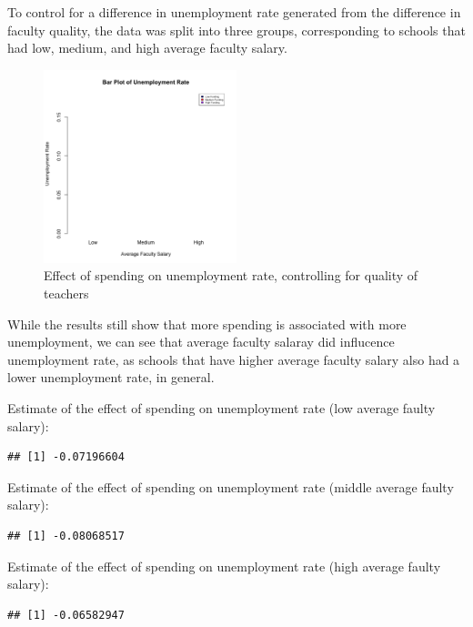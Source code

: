 \documentclass{article}\usepackage[]{graphicx}\usepackage[]{color}
\makeatletter
\newenvironment{kframe}{%
 \def\at@end@of@kframe{}%
 \ifinner\ifhmode%
  \def\at@end@of@kframe{\end{minipage}}%
  \begin{minipage}{\columnwidth}%
 \fi\fi%
 \def\FrameCommand##1{\hskip\@totalleftmargin \hskip-\fboxsep
 \colorbox{shadecolor}{##1}\hskip-\fboxsep
     \hskip-\linewidth \hskip-\@totalleftmargin \hskip\columnwidth}%
 \MakeFramed {\advance\hsize-\width
   \@totalleftmargin\z@ \linewidth\hsize
   \@setminipage}}%
 {\par\unskip\endMakeFramed%
 \at@end@of@kframe}
\newenvironment{knitrout}{}{} %
\makeatother
\begin{document}
To control for a difference in unemployment rate generated from the difference in faculty quality, the data was split into three groups, corresponding to schools that had low, medium, and high average faculty salary.  


\graphicspath{ {../images/} }
\begin{figure}
\centering
\includegraphics[width=0.5\textwidth]{funding}
\caption{Effect of spending on unemployment rate, controlling for quality of teachers}
\end{figure}


While the results still show that more spending is associated with more unemployment, we can see that average faculty salaray did influcence unemployment rate, as schools that have higher average faculty salary also had a lower unemployment rate, in general. 

Estimate of the effect of spending on unemployment rate (low average faulty salary):
\begin{knitrout}
\color{fgcolor}\begin{kframe}
\begin{verbatim}
## [1] -0.07196604
\end{verbatim}
\end{kframe}
\end{knitrout}

Estimate of the effect of spending on unemployment rate (middle average faulty salary):
\begin{knitrout}
\color{fgcolor}\begin{kframe}
\begin{verbatim}
## [1] -0.08068517
\end{verbatim}
\end{kframe}
\end{knitrout}


Estimate of the effect of spending on unemployment rate (high average faulty salary):
\begin{knitrout}
\color{fgcolor}\begin{kframe}
\begin{verbatim}
## [1] -0.06582947
\end{verbatim}
\end{kframe}
\end{knitrout}
\end{document}
